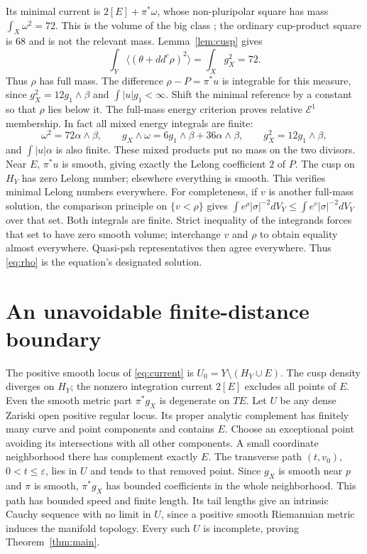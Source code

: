\documentclass[11pt]{article}
\newcommand{\ddc}{dd^c}
\begin{document}
Its minimal current is $2[E]+\pi^*\omega$, whose non-pluripolar
square has mass $\int_X\omega^2=72$. This is the volume of the
big class \cite[Definition 1.17]{BEGZ}; the ordinary cup-product square
is $68$ and is not the relevant mass. Lemma~\ref{lem:cusp} gives
\[
 \int_Y\langle(\theta+\ddc\rho)^2\rangle
                         =\int_Xg_X^2=72.
\]
Thus $\rho$ has full mass. The difference $\rho-P=\pi^*u$
is integrable for this measure, since $g_X^2=12g_1\wedge\beta$ and
$\int|u|g_1<\infty$. Shift the minimal reference by a constant so that $\rho$ lies below it.
The full-mass energy criterion
\cite[Proposition 2.11(ii)]{BEGZ} proves relative $\mathcal E^1$
membership. In fact all mixed energy integrals are finite:
\[
 \omega^2=72\alpha\wedge\beta,\qquad
 g_X\wedge\omega=6g_1\wedge\beta+36\alpha\wedge\beta,
 \qquad g_X^2=12g_1\wedge\beta,
\]
and $\int|u|\alpha$ is also finite. These mixed products put no
mass on the two divisors. Near $E$, $\pi^*u$ is smooth, giving
exactly the Lelong coefficient $2$ of $P$. The cusp on $H_Y$ has
zero Lelong number; elsewhere everything is smooth. This verifies
minimal Lelong numbers everywhere. For completeness, if $v$ is another
full-mass solution, the comparison principle \cite[Corollary 2.3]{BEGZ}
on $\{v<\rho\}$ gives
$\int e^\rho|\sigma|^{-2}dV_Y\leq\int e^v|\sigma|^{-2}dV_Y$
over that set. Both integrals are finite. Strict inequality of the
integrands forces that set to have zero smooth volume; interchange
$v$ and $\rho$ to obtain equality almost everywhere. Quasi-psh
representatives then agree everywhere. Thus \eqref{eq:rho} is the
equation's designated solution.

\section{An unavoidable finite-distance boundary}
The positive smooth locus of \eqref{eq:current} is
$U_0=Y\setminus(H_Y\cup E)$. The cusp density diverges on $H_Y$;
the nonzero integration current $2[E]$ excludes all points of $E$.
Even the smooth metric part $\pi^*g_X$ is degenerate on $TE$.
Let $U$ be any dense Zariski open positive regular locus.
Its proper analytic complement has finitely many curve and point
components \cite[Theorem 7.8 and Corollary 7.10]{Adamus} and contains
$E$. Choose an exceptional point avoiding its intersections with all
other components. A small coordinate neighborhood there has complement
exactly $E$. The transverse path $(t,v_0)$, $0<t\leq\varepsilon$,
lies in $U$ and tends to that removed point.
Since $g_X$ is smooth near $p$ and $\pi$ is smooth, $\pi^*g_X$ has
bounded coefficients in the whole neighborhood. This path has bounded
speed and finite length. Its tail lengths give an intrinsic Cauchy
sequence with no limit in $U$, since a positive smooth Riemannian
metric induces the manifold topology. Every such $U$ is incomplete,
proving Theorem~\ref{thm:main}.
\end{document}
